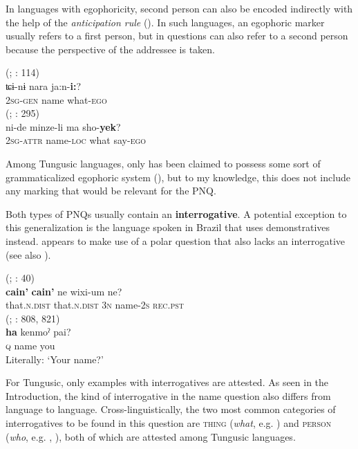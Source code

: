 \documentclass[output=paper,colorlinks,citecolor=brown]{langscibook}
\begin{document}
\pagebreak In languages with egophoricity, second person can also be encoded indirectly with the help of the \textit{anticipation rule} (\citealt[245]{TournadreLaPolla2014}). In such languages, an egophoric marker usually refers to a first person, but in questions can also refer to a second person because the perspective of the addressee is taken.

\ea
    \label{example4.20}
     (; \citealt{Faehndrich2007}: 114)\\
    \gll ʨɨ-nɨ		nara		ja:n-\textbf{i:}?\\
    2\textsc{sg-gen}		name		what-\textsc{ego}\\
\ex
    \label{example4.21}
     (; \citealt{Sandman2016}: 295)\\
    \gll ni-de		minze-li		ma		sho-\textbf{yek}?\\
    2\textsc{sg-attr}		name-\textsc{loc}		what		say-\textsc{ego}\\
    \z

Among Tungusic languages, only  has been claimed to possess some sort of grammaticalized egophoric system (\citealt{Li1984}), but to my knowledge, this does not include any marking that would be relevant for the PNQ.

Both types of PNQs usually contain an \textbf{interrogative}. A potential exception to this generalization is the language  spoken in Brazil that uses demonstratives instead.  appears to make use of a polar question that also lacks an interrogative (see also \citealt{Gil2018}).

\ea
    \label{example4.22}
     (; \citealt{EverettKern1997}: 40)\\
    \gll \textbf{cain’}		\textbf{cain’}		ne	wixi-um		ne?\\
    that.\textsc{n.dist}	that.\textsc{n.dist}	3\textsc{n}	name-2\textsc{s}		\textsc{rec.pst}\\
\ex
    \label{example4.23}
     (; \citealt{Schebesta1928}: 808, 821)\\
    \gll \textbf{ha}	kenmoˀ	pai?\\
    \textsc{q}	name	you\\
    \glt Literally: ‘Your name?’
    \z

For Tungusic, only examples with interrogatives are attested. As seen in the Introduction, the kind of interrogative in the name question also differs from language to language. Cross-linguistically, the two most common categories of interrogatives to be found in this question are \textsc{thing} (\textit{what}, e.g. ) and \textsc{person} (\textit{who}, e.g. , ), both of which are attested among Tungusic languages.
\end{document}
